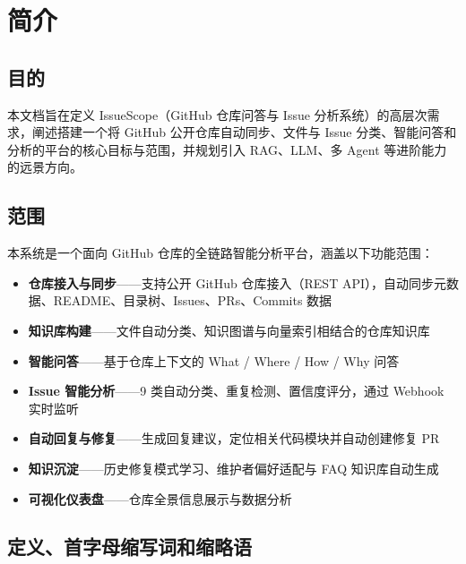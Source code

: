\documentclass[10pt,a4paper]{article}
\begin{document}
\section{简介}

\subsection{目的}
本文档旨在定义 IssueScope（GitHub 仓库问答与 Issue 分析系统）的高层次需求，阐述搭建一个将 GitHub 公开仓库自动同步、文件与 Issue 分类、智能问答和分析的平台的核心目标与范围，并规划引入 RAG、LLM、多 Agent 等进阶能力的远景方向。

\subsection{范围}

本系统是一个面向 GitHub 仓库的全链路智能分析平台，涵盖以下功能范围：

\begin{itemize}
    \item \textbf{仓库接入与同步}——支持公开 GitHub 仓库接入（REST API），自动同步元数据、README、目录树、Issues、PRs、Commits 数据
    \item \textbf{知识库构建}——文件自动分类、知识图谱与向量索引相结合的仓库知识库
    \item \textbf{智能问答}——基于仓库上下文的 What / Where / How / Why 问答
    \item \textbf{Issue 智能分析}——9 类自动分类、重复检测、置信度评分，通过 Webhook 实时监听
    \item \textbf{自动回复与修复}——生成回复建议，定位相关代码模块并自动创建修复 PR
    \item \textbf{知识沉淀}——历史修复模式学习、维护者偏好适配与 FAQ 知识库自动生成
    \item \textbf{可视化仪表盘}——仓库全景信息展示与数据分析
\end{itemize}

\subsection{定义、首字母缩写词和缩略语}
\end{document}
